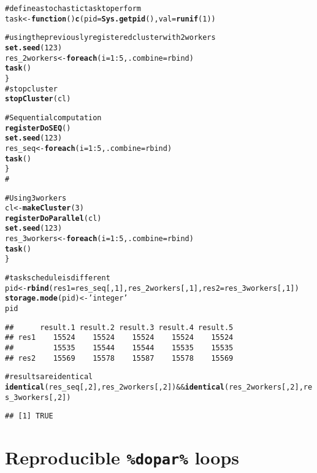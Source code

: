 \documentclass[a4paper,12pt]{article}\usepackage{graphicx, color}
\makeatletter
\newcommand{\hlfunctioncall}[1]{\textcolor[rgb]{0.501960784313725,0,0.329411764705882}{\textbf{#1}}}%
\newcommand{\hlstring}[1]{\textcolor[rgb]{0.6,0.6,1}{#1}}%
\newcommand{\hlcomment}[1]{\textcolor[rgb]{0.180392156862745,0.6,0.341176470588235}{#1}}%
\newenvironment{kframe}{%
 \def\at@end@of@kframe{}%
 \ifinner\ifhmode%
  \def\at@end@of@kframe{\end{minipage}}%
  \begin{minipage}{\columnwidth}%
 \fi\fi%
 \def\FrameCommand##1{\hskip\@totalleftmargin \hskip-\fboxsep
 \colorbox{shadecolor}{##1}\hskip-\fboxsep
     \hskip-\linewidth \hskip-\@totalleftmargin \hskip\columnwidth}%
 \MakeFramed {\advance\hsize-\width
   \@totalleftmargin\z@ \linewidth\hsize
   \@setminipage}}%
 {\par\unskip\endMakeFramed%
 \at@end@of@kframe}
\newenvironment{knitrout}{}{} %
\renewenvironment{knitrout}{\begin{footnotesize}}{\end{footnotesize}}
\makeatother
\begin{document}
\begin{knitrout}
\color{fgcolor}\begin{kframe}
\begin{alltt}

\hlcomment{# define a stochastic task to perform}
task <- \hlfunctioncall{function}() \hlfunctioncall{c}(pid=\hlfunctioncall{Sys.getpid}(), val=\hlfunctioncall{runif}(1))

\hlcomment{# using the previously registered cluster with 2 workers}
\hlfunctioncall{set.seed}(123)
res_2workers <- \hlfunctioncall{foreach}(i=1:5, .combine=rbind) %dorng% \{
	\hlfunctioncall{task}()
\}
\hlcomment{# stop cluster}
\hlfunctioncall{stopCluster}(cl)

\hlcomment{# Sequential computation}
\hlfunctioncall{registerDoSEQ}()
\hlfunctioncall{set.seed}(123)
res_seq <- \hlfunctioncall{foreach}(i=1:5, .combine=rbind) %dorng% \{
	\hlfunctioncall{task}() 
\}
\hlcomment{#}

\hlcomment{# Using 3 workers}
cl <- \hlfunctioncall{makeCluster}(3)
\hlfunctioncall{registerDoParallel}(cl)
\hlfunctioncall{set.seed}(123)
res_3workers <- \hlfunctioncall{foreach}(i=1:5, .combine=rbind) %dorng% \{ 
	\hlfunctioncall{task}()
\}

\hlcomment{# task schedule is different}
pid <- \hlfunctioncall{rbind}(res1=res_seq[,1], res_2workers[,1], res2=res_3workers[,1])
\hlfunctioncall{storage.mode}(pid) <- \hlstring{'integer'}
pid
\end{alltt}
\begin{verbatim}
##      result.1 result.2 result.3 result.4 result.5
## res1    15524    15524    15524    15524    15524
##         15535    15544    15544    15535    15535
## res2    15569    15578    15587    15578    15569
\end{verbatim}
\begin{alltt}
\hlcomment{# results are identical}
\hlfunctioncall{identical}(res_seq[,2], res_2workers[,2]) && \hlfunctioncall{identical}(res_2workers[,2], res_3workers[,2])
\end{alltt}
\begin{verbatim}
## [1] TRUE
\end{verbatim}
\end{kframe}
\end{knitrout}


\section{Reproducible \texttt{\%dopar\%} loops}
\end{document}
